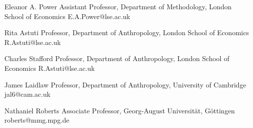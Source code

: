 

\begin{cvreferences}

  \cvreference
    {Eleanor A. Power} %
    {Assistant Professor, Department of Methodology, London School of Economics} %
    {E.A.Power@lse.ac.uk}

  \cvreference
    {Rita Astuti} %
    {Professor, Department of Anthropology, London School of Economics} %
    {R.Astuti@lse.ac.uk}

  \cvreference
    {Charles Stafford} %
    {Professor, Department of Anthropology, London School of Economics} %
    {R.Astuti@lse.ac.uk}


\end{cvreferences}


\begin{cvreferences}

  \cvreference
    {James Laidlaw} %
    {Professor, Department of Anthropology, University of Cambridge} %
    {jal6@cam.ac.uk}

  \cvreference
    {Nathaniel Roberts} %
    {Associate Professor, Georg-August Universität, Göttingen} %
    {roberts@mmg.mpg.de}

\end{cvreferences}
